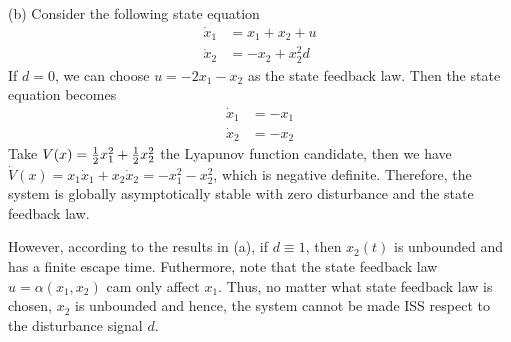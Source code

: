 \documentclass[a4 paper, 12pt]{article}
\begin{document}
(b) Consider the following state equation
\begin{align}
        \dot{x}_1 &= x_1 + x_2 + u \\
        \dot{x}_2 &= -x_2 + x_2^2d
\end{align}
If $d = 0$, we can choose $u = -2x_1-x_2$ as the state feedback law. Then the state equation becomes
\begin{align}
        \dot{x}_1 &= -x_1\\
        \dot{x}_2 &= -x_2
\end{align}
Take $V(x) = \frac{1}{2} x_1^2 + \frac{1}{2} x_2^2$ the Lyapunov function candidate, then we have $\dot{V}(x) = x_1\dot{x}_1 + x_2\dot{x}_2 = -x_1^2-x_2^2$,  which is negative definite. Therefore, the system is globally asymptotically stable with zero disturbance and the state feedback law.

However, according to the results in (a), if $d \equiv 1$, then $x_2(t)$ is unbounded and has a finite escape time. Futhermore, note that the state feedback law $u=\alpha(x_1,x_2)$ cam only affect $x_1$. Thus, no matter what state feedback law is chosen, $x_2$ is unbounded and hence, the system cannot be made ISS respect to the disturbance signal $d$.


% 



    
\end{document}
